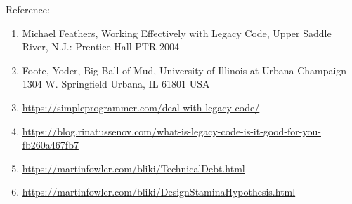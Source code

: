 \documentclass[12pt]{article}
\begin{document}
Reference: 
\begin{enumerate}
\item Michael Feathers, Working Effectively with Legacy Code, Upper Saddle River, N.J.: Prentice Hall PTR 2004
\item Foote, Yoder, Big Ball of Mud, University of Illinois at Urbana-Champaign 1304 W. Springfield Urbana, IL 61801 USA
\item \href{https://simpleprogrammer.com/deal-with-legacy-code/}{https://simpleprogrammer.com/deal-with-legacy-code/}
\item \href{https://blog.rinatussenov.com/what-is-legacy-code-is-it-good-for-you-fb260a467fb7}{https://blog.rinatussenov.com/what-is-legacy-code-is-it-good-for-you-fb260a467fb7} 
\item \href{https://martinfowler.com/bliki/TechnicalDebt.html}{https://martinfowler.com/bliki/TechnicalDebt.html} 
\item \href{https://martinfowler.com/bliki/DesignStaminaHypothesis.html}{https://martinfowler.com/bliki/DesignStaminaHypothesis.html}
\end{enumerate}
\end{document}

